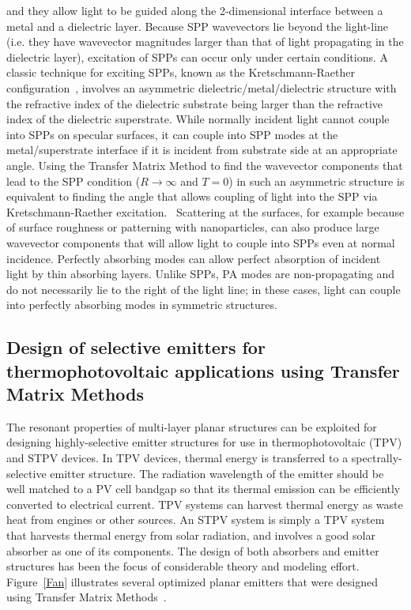 \documentclass[10pt,letterpaper]{article}
\begin{document}
and they allow light to be guided along the 2-dimensional interface between a metal and a dielectric layer.  Because SPP wavevectors lie beyond the light-line (i.e. they have wavevector magnitudes larger than that of light propagating in the dielectric layer), excitation of SPPs can occur only under certain conditions.  A classic technique for exciting SPPs, known as the Kretschmann-Raether configuration~\cite{Raether},  involves an asymmetric dielectric/metal/dielectric structure with the refractive index of the dielectric substrate being larger than the refractive index of the dielectric superstrate.  While normally incident light cannot couple into SPPs on specular surfaces, it can couple into SPP modes at the metal/superstrate interface if it is incident from substrate side at an appropriate angle.  Using the Transfer Matrix Method to find the  wavevector components that lead to the SPP condition ($R \rightarrow \infty$ and $T=0$) in such an asymmetric structure is equivalent to finding the angle that allows coupling of light into the SPP via Kretschmann-Raether excitation.~\cite{Raether, FHR_SciRep_2015}  Scattering at the surfaces, for example because of surface roughness or patterning with nanoparticles, can also produce large wavevector components that will allow light to couple into SPPs even at normal incidence.  Perfectly absorbing
modes can allow perfect absorption of incident light by thin absorbing layers.  Unlike SPPs, PA modes are 
non-propagating and do not necessarily lie to the right of the light line; in these cases, light can couple into perfectly absorbing modes in symmetric structures.~\cite{FHR_SciRep_2015}

\subsection{Design of selective emitters for thermophotovoltaic applications using Transfer Matrix Methods}
The resonant properties of multi-layer planar structures can be exploited for designing highly-selective emitter structures for use in
thermophotovoltaic (TPV) and STPV devices.  In TPV devices, thermal energy is transferred to a 
spectrally-selective emitter
structure.  The radiation wavelength of the emitter should be well matched to a PV cell bandgap so that its thermal emission can be efficiently converted
to electrical current.  TPV systems can harvest thermal energy as waste heat from engines or other sources.  An STPV system is simply 
a TPV system that harvests thermal energy from solar radiation, and involves a good solar absorber as one of its components.
The design of both absorbers and emitter structures has been the focus of considerable theory and modeling effort.
Figure~\ref{Fan} illustrates several optimized planar emitters that were designed using Transfer Matrix Methods~\cite{BN_JApplPhys_2005, LZ_JApplPhys_2006, RF_OptExp_2009}.
\end{document}
